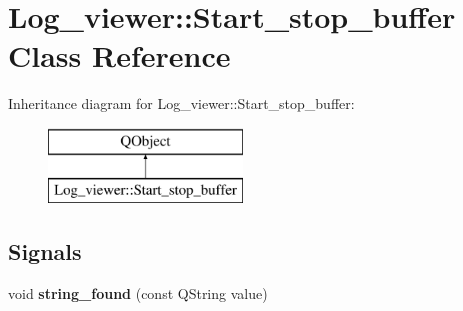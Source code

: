 \hypertarget{class_log__viewer_1_1_start__stop__buffer}{\section{Log\-\_\-viewer\-:\-:Start\-\_\-stop\-\_\-buffer Class Reference}
\label{class_log__viewer_1_1_start__stop__buffer}
}
Inheritance diagram for Log\-\_\-viewer\-:\-:Start\-\_\-stop\-\_\-buffer\-:\begin{figure}[H]
\begin{center}
\leavevmode
\includegraphics[height=2.000000cm]{class_log__viewer_1_1_start__stop__buffer}
\end{center}
\end{figure}
\subsection*{Signals}
\begin{DoxyCompactItemize}
\item 
\hypertarget{class_log__viewer_1_1_start__stop__buffer_a400dc9ab4a618a67f32d7fe4fed36e91}{void {\bfseries string\-\_\-found} (const Q\-String value)}\label{class_log__viewer_1_1_start__stop__buffer_a400dc9ab4a618a67f32d7fe4fed36e91}

\end{DoxyCompactItemize}

